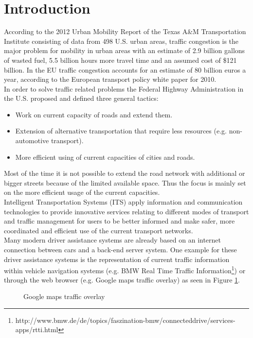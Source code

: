\documentclass{sig-alternate}
\begin{document}
\section{Introduction}
According to the 2012 Urban Mobility Report of the Texas A\&M Transportation Institute\cite{schrank2012tti} consisting of data from 498 U.S. urban areas, traffic congestion is the major problem for mobility in urban areas with an estimate of 2.9 billion gallons of wasted fuel, 5.5 billion hours more travel time and an assumed cost of \$121 billion. In the EU traffic congestion accounts for an estimate of 80 billion euros a year, according to the European transport policy white paper for 2010\cite{eutraffic}.\\
In order to solve traffic related problems the Federal Highway Administration in the U.S. proposed and defined three general tactics\cite{systematics2005traffic}:
\begin{itemize}
\item Work on current capacity of roads and extend them.
\item Extension of alternative transportation that require less resources (e.g. non-automotive transport).
\item More efficient using of current capacities of cities and roads.
\end{itemize}
Most of the time it is not possible to extend the road network with additional or bigger streets because of the limited available space. Thus the focus is mainly set on the more efficient usage of the current capacities. \\
Intelligent Transportation Systems (ITS) apply information and communication technologies to provide innovative services relating to different modes of transport and traffic management for users to be better informed and make safer, more coordinated and efficient use of the current transport networks.\\ 
Many modern driver assistance systems are already based on an internet connection between cars and a back-end server system. One example for these driver assistance systems is the representation of current traffic information within vehicle navigation systems (e.g. BMW Real Time Traffic Information\footnote{http://www.bmw.de/de/topics/faszination-bmw/connecteddrive/services-apps/rtti.html}) or through the web browser (e.g. Google maps traffic overlay) as seen in Figure \ref{fig:google1}.
\begin{figure} 
\centering
{}
\caption{Google maps traffic overlay}
\label{fig:google1}
\end{figure}
\end{document}
